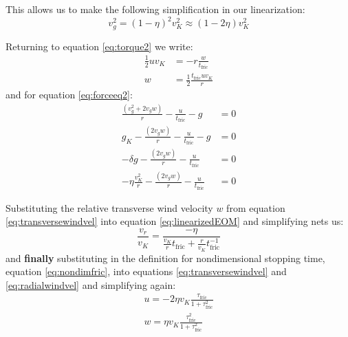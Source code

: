 \documentclass[12pt]{article}
\begin{document}
This allows us to make the following simplification in our linearization: 
$$v_g^2 = (1-\eta)^2v_K^2 \approx (1-2\eta)v_K^2 $$

Returning to equation \ref{eq:torque2} we write:
\begin{align}
    \frac{1}{2}uv_K &= -r\frac{w}{t_{\mathrm{fric}}} \\
    \label{eq:transversewindvel}
    w &= \frac{1}{2} \frac{t_{\mathrm{fric}} uv_K}{r}
\end{align}
and for equation \ref{eq:forceeq2}:
\begin{align}
    \frac{(v_g^2 +2v_gw)}{r} - \frac{u}{t_{\mathrm{fric}}} - g &= 0 \\
    g_K - \frac{(2v_gw)}{r}  - \frac{u}{t_{\mathrm{fric}}} - g &= 0 \\
    -\delta g - \frac{(2v_gw)}{r}  - \frac{u}{t_{\mathrm{fric}}} &= 0 \\
    \label{eq:linearizedEOM}
    -\eta \frac{v_K^2}{r} - \frac{(2v_gw)}{r}  - \frac{u}{t_{\mathrm{fric}}} &= 0 
\end{align}

Substituting the relative transverse wind velocity $w$ from equation \ref{eq:transversewindvel} into equation \ref{eq:linearizedEOM} and simplifying nets us:
\begin{equation}
   \label{eq:radialwindvel}
    \frac{v_r}{v_K} = \frac{-\eta}{ \frac{v_K}{r}t_{\mathrm{fric}} + \frac{r}{v_K}t_{\mathrm{fric}}^{-1}}
\end{equation}
and \textbf{finally} substituting in the definition for nondimensional stopping time, equation \ref{eq:nondimfric}, into equations \ref{eq:transversewindvel} and \ref{eq:radialwindvel} and simplifying again:
\begin{align}
    \label{eq:nondimradialwindvel}
    u = -2\eta v_K \frac{\tau_{\mathrm{fric}}}{1 + \tau_{\mathrm{fric}}^2} \\
    \label{eq:nondimtransversewindvel}
    w = \eta v_K \frac{\tau_{\mathrm{fric}}^2}{1 + \tau_{\mathrm{fric}}^2}
\end{align}
\end{document}
